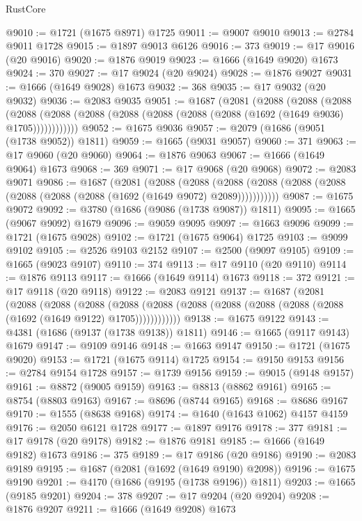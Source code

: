 \begin{lexlean}{RustCore}
\begin{coremodule}
@9010 := @1721 (@1675 @8971) @1725
@9011 := @9007 @9010
@9013 := @2784 @9011 @1728
@9015 := @1897 @9013 @6126
@9016 := 373
@9019 := @17 @9016 (@20 @9016)
@9020 := @1876 @9019
@9023 := @1666 (@1649 @9020) @1673
@9024 := 370
@9027 := @17 @9024 (@20 @9024)
@9028 := @1876 @9027
@9031 := @1666 (@1649 @9028) @1673
@9032 := 368
@9035 := @17 @9032 (@20 @9032)
@9036 := @2083 @9035
@9051 := @1687
    (@2081
      (@2088
        (@2088
          (@2088
            (@2088 (@2088 (@2088 (@2088 (@2088 (@2088 (@2088 (@1692 (@1649 @9036) @1705))))))))))))
@9052 := @1675 @9036
@9057 := @2079 (@1686 (@9051 (@1738 @9052)) @1811)
@9059 := @1665 (@9031 @9057)
@9060 := 371
@9063 := @17 @9060 (@20 @9060)
@9064 := @1876 @9063
@9067 := @1666 (@1649 @9064) @1673
@9068 := 369
@9071 := @17 @9068 (@20 @9068)
@9072 := @2083 @9071
@9086 := @1687
    (@2081
      (@2088
        (@2088
          (@2088 (@2088 (@2088 (@2088 (@2088 (@2088 (@2088 (@1692 (@1649 @9072) @2089)))))))))))
@9087 := @1675 @9072
@9092 := @3780 (@1686 (@9086 (@1738 @9087)) @1811)
@9095 := @1665 (@9067 @9092) @1679
@9096 := @9059 @9095
@9097 := @1663 @9096
@9099 := @1721 (@1675 @9028)
@9102 := @1721 (@1675 @9064) @1725
@9103 := @9099 @9102
@9105 := @2526 @9103 @2152
@9107 := @2500 (@9097 @9105)
@9109 := @1665 (@9023 @9107)
@9110 := 374
@9113 := @17 @9110 (@20 @9110)
@9114 := @1876 @9113
@9117 := @1666 (@1649 @9114) @1673
@9118 := 372
@9121 := @17 @9118 (@20 @9118)
@9122 := @2083 @9121
@9137 := @1687
    (@2081
      (@2088
        (@2088
          (@2088
            (@2088 (@2088 (@2088 (@2088 (@2088 (@2088 (@2088 (@1692 (@1649 @9122) @1705))))))))))))
@9138 := @1675 @9122
@9143 := @4381 (@1686 (@9137 (@1738 @9138)) @1811)
@9146 := @1665 (@9117 @9143) @1679
@9147 := @9109 @9146
@9148 := @1663 @9147
@9150 := @1721 (@1675 @9020)
@9153 := @1721 (@1675 @9114) @1725
@9154 := @9150 @9153
@9156 := @2784 @9154 @1728
@9157 := @1739 @9156
@9159 := @9015 (@9148 @9157)
@9161 := @8872 (@9005 @9159)
@9163 := @8813 (@8862 @9161)
@9165 := @8754 (@8803 @9163)
@9167 := @8696 (@8744 @9165)
@9168 := @8686 @9167
@9170 := @1555 (@8638 @9168)
@9174 := @1640 (@1643 @1062) @4157 @4159
@9176 := @2050 @6121 @1728
@9177 := @1897 @9176
@9178 := 377
@9181 := @17 @9178 (@20 @9178)
@9182 := @1876 @9181
@9185 := @1666 (@1649 @9182) @1673
@9186 := 375
@9189 := @17 @9186 (@20 @9186)
@9190 := @2083 @9189
@9195 := @1687 (@2081 (@1692 (@1649 @9190) @2098))
@9196 := @1675 @9190
@9201 := @4170 (@1686 (@9195 (@1738 @9196)) @1811)
@9203 := @1665 (@9185 @9201)
@9204 := 378
@9207 := @17 @9204 (@20 @9204)
@9208 := @1876 @9207
@9211 := @1666 (@1649 @9208) @1673

\end{coremodule}
\end{lexlean}
